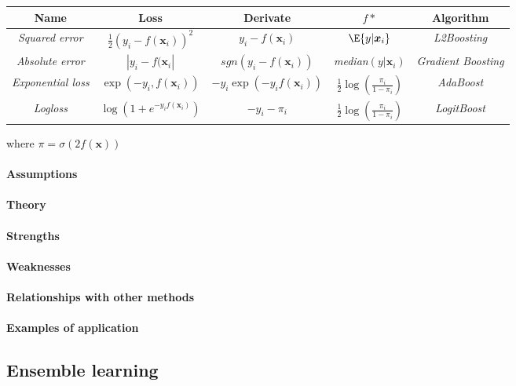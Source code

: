 \begin{center}
    \begin{tabular}{|*{5}{c|}}
    \hline
    \textbf{Name} & \textbf{Loss}& \textbf{Derivate}& \textbf{$f{*}$} & \textbf{Algorithm}\\
    \hline
    \emph{Squared error} & $\frac{1}{2}\left(y_{i}-f(\bm{x}_{i})\right)^{2}$ & 
    $y_{i}-f(\bm{x}_{i})$ & $\E{y|\bm{x}_{i}}$ & \emph{L2Boosting}\\
    \hline
    \emph{Absolute error} & $|y_{i}-f(\bm{x}_{i}|$ & 
    $sgn(y_{i}-f(\bm{x}_{i}))$ & \emph{median}$(y|\bm{x}_{i})$ & \emph{Gradient 
    Boosting}\\
    \hline
    \emph{Exponential loss} & $\exp\left(-y_{i},f(\bm{x}_{i})\right)$ & $-y_{i}\exp(
    -y_{i}f(\bm{x}_{i}))$ & $\frac{1}{2}\log\left(\frac{\pi_{i}}{1 - \pi_{i}}\right)$&
    \emph{AdaBoost}\\
    \hline
    \emph{Logloss} & $\log\left(1+e^{-y_{i}f(\bm{x}_{i})}\right)$ & $-y_{i}-\pi_{i}$ &
    $\frac{1}{2}\log\left(\frac{\pi_{i}}{1 - \pi_{i}}\right)$ & \emph{LogitBoost}\\
    \hline
    \end{tabular}
\end{center}
where $\pi=\sigma\left(2f(\bm{x})\right)$


\paragraph{Assumptions}
\paragraph{Theory}
\paragraph{Strengths}
\paragraph{Weaknesses}
\paragraph{Relationships with other methods}
\paragraph{Examples of application}

\subsection{Ensemble learning}
